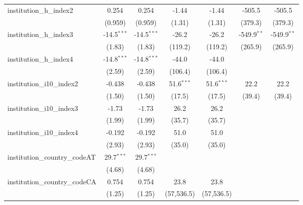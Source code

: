 \begin{tabular}{lcccccc}
   institution\_h\_index2                & 0.254         & 0.254         & -1.44        & -1.44        & -505.5        & -505.5\\   
                                         & (0.959)       & (0.959)       & (1.31)       & (1.31)       & (379.3)       & (379.3)\\   
   institution\_h\_index3                & -14.5$^{***}$ & -14.5$^{***}$ & -26.2        & -26.2        & -549.9$^{**}$ & -549.9$^{**}$\\   
                                         & (1.83)        & (1.83)        & (119.2)      & (119.2)      & (265.9)       & (265.9)\\   
   institution\_h\_index4                & -14.8$^{***}$ & -14.8$^{***}$ & -44.0        & -44.0        &               &   \\   
                                         & (2.59)        & (2.59)        & (106.4)      & (106.4)      &               &   \\   
   institution\_i10\_index2              & -0.438        & -0.438        & 51.6$^{***}$ & 51.6$^{***}$ & 22.2          & 22.2\\   
                                         & (1.50)        & (1.50)        & (17.5)       & (17.5)       & (39.4)        & (39.4)\\   
   institution\_i10\_index3              & -1.73         & -1.73         & 26.2         & 26.2         &               &   \\   
                                         & (1.99)        & (1.99)        & (35.7)       & (35.7)       &               &   \\   
   institution\_i10\_index4              & -0.192        & -0.192        & 51.0         & 51.0         &               &   \\   
                                         & (2.93)        & (2.93)        & (35.0)       & (35.0)       &               &   \\   
   institution\_country\_codeAT          & 29.7$^{***}$  & 29.7$^{***}$  &              &              &               &   \\   
                                         & (4.68)        & (4.68)        &              &              &               &   \\   
   institution\_country\_codeCA          & 0.754         & 0.754         & 23.8         & 23.8         &               &   \\   
                                         & (1.25)        & (1.25)        & (57,536.5)   & (57,536.5)   &               &   \\   

\end{tabular}
